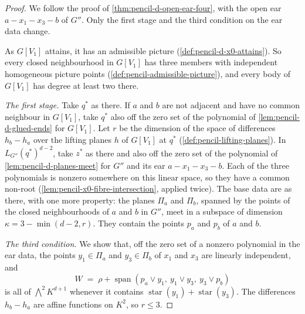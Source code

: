 \begin{proof}
  \leanok
  We follow the proof of \cref{thm:pencil-d-open-ear-four}, with the open
  ear $a - x_1 - x_3 - b$ of $G''$. Only the first stage and the third
  condition on the ear data change.

  As $G[V_1]$ attains, it has an admissible picture
  (\cref{def:pencil-d-x0-attains}). So every closed neighbourhood in
  $G[V_1]$ has three members with independent homogeneous picture points
  (\cref{def:pencil-admissible-picture}), and every body of $G[V_1]$ has
  degree at least two there.

  \emph{The first stage.} Take $q^*$ as there. If $a$ and $b$ are not
  adjacent and have no common neighbour in $G[V_1]$, take $q^*$ also off
  the zero set of the polynomial of \cref{lem:pencil-d-glued-ends} for
  $G[V_1]$. Let $r$ be the dimension of the space of differences
  $h_b - h_a$ over the lifting planes $h$ of $G[V_1]$ at $q^*$
  (\cref{def:pencil-lifting-planes}). In $L_{G''}(q^*)^{d-2}$, take $z^*$
  as there and also off the zero set of the polynomial of
  \cref{lem:pencil-d-planes-meet} for $G''$ and its ear
  $a - x_1 - x_3 - b$. Each of the three polynomials is nonzero somewhere
  on this linear space, so they have a common non-root
  (\cref{lem:pencil-x0-fibre-intersection}, applied twice). The base data
  are as there, with one more property: the planes $\Pi_a$ and $\Pi_b$,
  spanned by the points of the closed neighbourhoods of $a$ and $b$ in
  $G''$, meet in a subspace of dimension $\kappa = 3 - \min(d - 2, r)$.
  They contain the points $p_a$ and $p_b$ of $a$ and $b$.

  \emph{The third condition.} We show that, off the zero set of a nonzero
  polynomial in the ear data, the points $y_1 \in \Pi_a$ and
  $y_3 \in \Pi_b$ of $x_1$ and $x_3$ are linearly independent, and
  \[
    W \;=\; \rho + \operatorname{span}(p_a \vee y_1,\ y_1 \vee y_3,\
    y_3 \vee p_b)
  \]
  is all of $\bigwedge^2 K^{d+1}$ whenever it contains
  $\operatorname{star}(y_1) + \operatorname{star}(y_3)$. The
  differences $h_b - h_a$ are affine functions on $K^2$, so $r \le 3$.


\end{proof}
